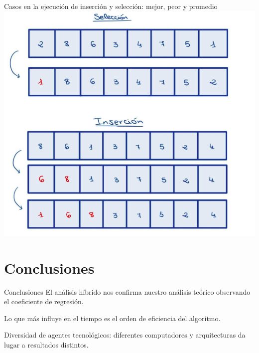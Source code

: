 \documentclass[10pt, xcolor=table]{beamer}
\begin{document}
\begin{frame}[fragile]{Casos en la ejecución de inserción y selección: mejor, peor y promedio}
	\centering
	\includegraphics[scale=0.18]{../../Images/Ejemplo vectores.png}
\end{frame}

\section{Conclusiones}

\begin{frame}{Conclusiones}
El análisis híbrido nos confirma nuestro análisis teórico observando el coeficiente de regresión.

Lo que más influye en el tiempo es el orden de eficiencia del algoritmo.

Diversidad de agentes tecnológicos: diferentes computadores y arquitecturas da lugar a resultados distintos.
\end{frame}
\end{document}
